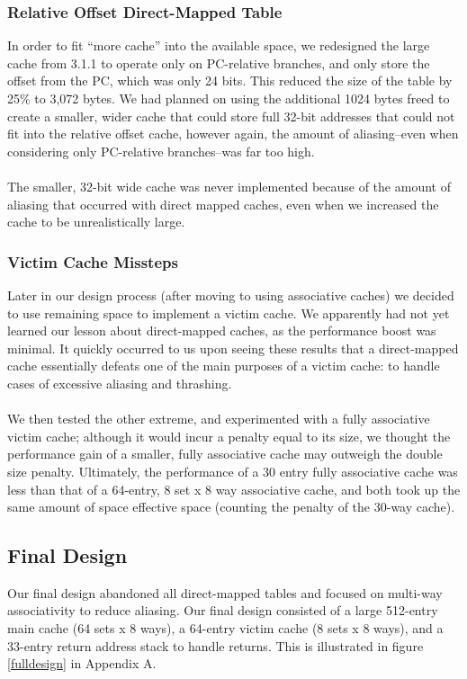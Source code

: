 \documentclass[twocolumn]{article}
\begin{document}
\subsubsection{Relative Offset Direct-Mapped Table}
In order to fit ``more cache'' into the available space, we redesigned the large cache from 3.1.1 to operate only on PC-relative branches, and only store the offset from the PC, which was only 24 bits.  This reduced the size of the table by 25\% to 3,072 bytes.  We had planned on using the additional 1024 bytes freed to create a smaller, wider cache that could store full 32-bit addresses that could not fit into the relative offset cache, however again, the amount of aliasing--even when considering only PC-relative branches--was far too high.\\\\
The smaller, 32-bit wide cache was never implemented because of the amount of aliasing that occurred with direct mapped caches, even when we increased the cache to be unrealistically large. 
\subsubsection{Victim Cache Missteps}
Later in our design process (after moving to using associative caches) we decided to use remaining space to implement a victim cache.  We apparently had not yet learned our lesson about direct-mapped caches, as the performance boost was minimal.  It quickly occurred to us upon seeing these results that a direct-mapped cache essentially defeats one of the main purposes of a victim cache: to handle cases of excessive aliasing and thrashing.\\\\
We then tested the other extreme, and experimented with a fully associative victim cache; although it would incur a penalty equal to its size, we thought the performance gain of a smaller, fully associative cache may outweigh the double size penalty.  Ultimately, the performance of a 30 entry fully associative cache was less than that of a 64-entry, 8 set x 8 way associative cache, and both took up the same amount of space effective space (counting the penalty of the 30-way cache). 
\subsection{Final Design}
Our final design abandoned all direct-mapped tables and focused on multi-way associativity to reduce aliasing.  Our final design consisted of a large 512-entry main cache (64 sets x 8 ways), a 64-entry victim cache (8 sets x 8 ways), and a 33-entry return address stack to handle returns.  This is illustrated in figure \ref{fulldesign} in Appendix A.
\end{document}
